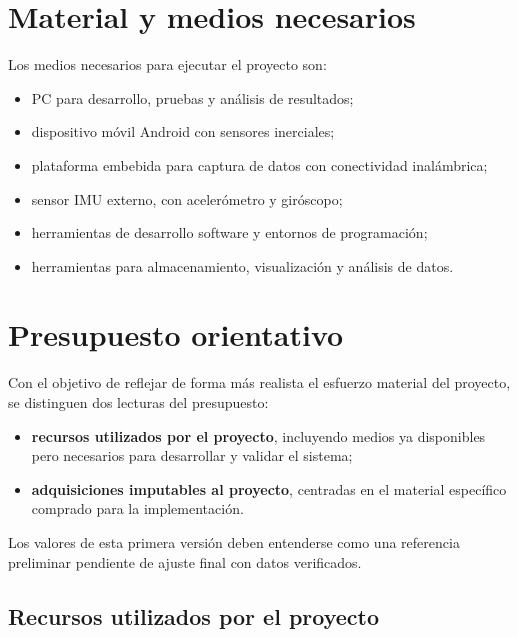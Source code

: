 \section{Material y medios necesarios}

Los medios necesarios para ejecutar el proyecto son:

\begin{itemize}
  \item PC para desarrollo, pruebas y análisis de resultados;
  \item dispositivo móvil Android con sensores inerciales;
  \item plataforma embebida para captura de datos con conectividad inalámbrica;
  \item sensor IMU externo, con acelerómetro y giróscopo;
  \item herramientas de desarrollo software y entornos de programación;
  \item herramientas para almacenamiento, visualización y análisis de datos.
\end{itemize}

\section{Presupuesto orientativo}

Con el objetivo de reflejar de forma más realista el esfuerzo material del proyecto, se distinguen dos lecturas del presupuesto:

\begin{itemize}
  \item \textbf{recursos utilizados por el proyecto}, incluyendo medios ya disponibles pero necesarios para desarrollar y validar el sistema;
  \item \textbf{adquisiciones imputables al proyecto}, centradas en el material específico comprado para la implementación.
\end{itemize}

Los valores de esta primera versión deben entenderse como una referencia preliminar pendiente de ajuste final con datos verificados.

\subsection{Recursos utilizados por el proyecto}

